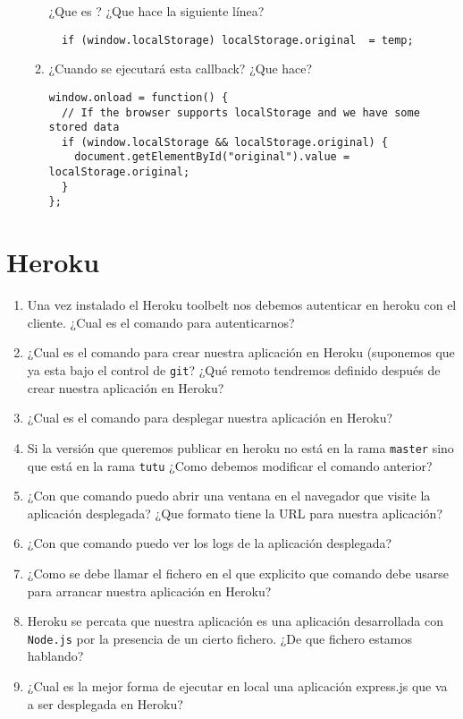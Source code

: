 \documentclass[spanish,a4paper,11pt]{article}
\begin{document}
\begin{enumerate}
\begin{enumerate}
¿Que es ? ¿Que hace la siguiente línea?
\begin{verbatim}
  if (window.localStorage) localStorage.original  = temp;
\end{verbatim}
\item  ¿Cuando se ejecutará esta callback? ¿Que hace?
\begin{verbatim}
window.onload = function() {
  // If the browser supports localStorage and we have some stored data
  if (window.localStorage && localStorage.original) {
    document.getElementById("original").value = localStorage.original;
  }
};
\end{verbatim}
\end{enumerate}
\end{enumerate}


\section{Heroku}
\begin{enumerate}
\item  Una vez instalado el Heroku toolbelt nos debemos autenticar en heroku con el cliente.
¿Cual es el comando para autenticarnos?
\item 
¿Cual es el comando para crear nuestra aplicación en Heroku (suponemos que ya esta bajo el control de \verb|git|? ¿Qué remoto tendremos definido después de crear nuestra aplicación en Heroku?
\item 
¿Cual es el comando para desplegar nuestra aplicación en Heroku?
\item 
Si la versión que queremos publicar en heroku no está en la rama
\verb|master| sino que está en la rama \verb|tutu| ¿Como debemos 
modificar el comando anterior?
\item 
¿Con que comando puedo abrir una ventana en el navegador que visite la aplicación desplegada?
¿Que formato tiene la URL para nuestra aplicación?
\item 
¿Con que comando puedo ver los logs de la aplicación desplegada?
\item 
¿Como se debe llamar el fichero en el que explicito que comando debe usarse para arrancar 
nuestra aplicación en Heroku?
\item 
Heroku se percata  que nuestra aplicación es una aplicación desarrollada con \verb|Node.js|
por la presencia de un cierto fichero. ¿De que fichero estamos hablando?
\item 
¿Cual es la mejor forma de ejecutar en local una aplicación express.js 
que va a ser desplegada en Heroku?
\end{enumerate}
\end{document}
